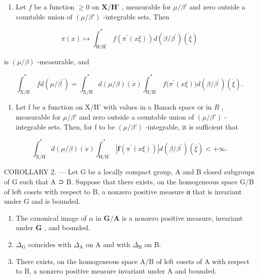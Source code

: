 \begin{enumerate}
\def\labelenumi{\alph{enumi})}
\setcounter{enumi}{1}
\tightlist
\item
  Let \(f\) be a function \(\geqslant 0\) on \(\mathbf{X} / \mathbf{H}'\) , measurable for \(\mu / \beta'\) and zero outside a countable union of \((\mu / \beta')\) -integrable sets. Then
\end{enumerate}

\[
\pi (x) \mapsto \int_ {\mathrm{H} / \mathrm{H} ^ {\prime}} ^ {*} f (\pi^ {\prime} (x \xi)) d (\beta / \beta^ {\prime}) (\dot {\xi})
\]

is \((\mu /\beta)\) -measurable, and

\[
\int_ {\mathrm {X/ H^ {\prime}}} ^ {*} f d (\mu / \beta^ {\prime}) = \int_ {\mathrm{X/H}} ^ {*} d (\mu / \beta) (\dot {x}) \int_ {\mathrm {H/ H^ {\prime}}} ^ {*} f \bigl (\pi^ {\prime} (x \xi) \bigr) d (\beta / \beta^ {\prime}) (\dot {\xi}).
\]

\begin{enumerate}
\def\labelenumi{\alph{enumi})}
\setcounter{enumi}{2}
\tightlist
\item
  Let f be a function on X/H' with values in a Banach space or in \(\overline{R}\) , measurable for \(\mu/\beta'\) and zero outside a countable union of \((\mu/\beta')\) -integrable sets. Then, for f to be \((\mu/\beta')\) -integrable, it is sufficient that
\end{enumerate}

\[
\int_ {\mathrm{X} / \mathrm{H}} ^ {*} d (\mu / \beta) (\dot {x}) \int_ {\mathrm{H} / \mathrm{H} ^ {\prime}} ^ {*} | \mathbf {f} (\pi^ {\prime} (x \xi)) | d (\beta / \beta^ {\prime}) (\dot {\xi}) <   + \infty .
\]

COROLLARY 2. --- Let G be a locally compact group, A and B closed subgroups of G such that A ⊃ B. Suppose that there exists, on the homogeneous space G/B of left cosets with respect to B, a nonzero positive measure α that is invariant under G and is bounded.

\begin{enumerate}
\def\labelenumi{\alph{enumi})}
\item
  The canonical image of \(\alpha\) in \(\mathbf{G} / \mathbf{A}\) is a nonzero positive measure, invariant under \(\mathbf{G}\) , and bounded.
\item
  \(\Delta_{\mathrm{G}}\) coincides with \(\Delta_{\mathrm{A}}\) on A and with \(\Delta_{\mathrm{B}}\) on B.
\item
  There exists, on the homogeneous space A/B of left cosets of A with respect to B, a nonzero positive measure invariant under A and bounded.
\end{enumerate}

